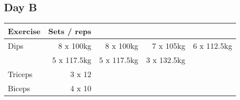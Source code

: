 \documentclass[12pt, a4paper]{article}%
\begin{document}
  \subsection*{\hspace{0.5em} Day B }


  \begin{tabular}{l|rrrr}
  \hspace{0.75em} \textbf{Exercise} & \textbf{Sets / reps} \\ \hline

            \hspace{0.75em} Dips
            & 8 x 100kg
            & 8 x 100kg
            & 7 x 105kg
            & 6 x 112.5kg
            \\


            \hspace{0.75em}
            & 5 x 117.5kg
            & 5 x 117.5kg
            & 3 x 132.5kg
            & 
            \\


   \hspace{0.75em} Triceps & 3 x 12 \\
   \hspace{0.75em} Biceps & 4 x 10 \\
  \end{tabular}
\end{document}
